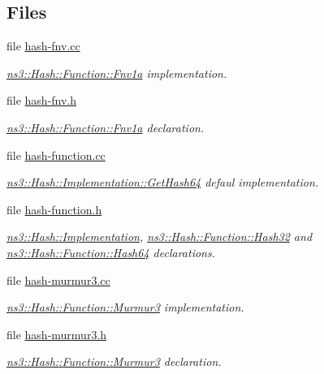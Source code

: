 \subsection*{Files}
\begin{DoxyCompactItemize}
\item 
file \hyperlink{hash-fnv_8cc}{hash-\/fnv.\+cc}
\begin{DoxyCompactList}\small\item\em \hyperlink{classns3_1_1Hash_1_1Function_1_1Fnv1a}{ns3\+::\+Hash\+::\+Function\+::\+Fnv1a} implementation. \end{DoxyCompactList}\item 
file \hyperlink{hash-fnv_8h}{hash-\/fnv.\+h}
\begin{DoxyCompactList}\small\item\em \hyperlink{classns3_1_1Hash_1_1Function_1_1Fnv1a}{ns3\+::\+Hash\+::\+Function\+::\+Fnv1a} declaration. \end{DoxyCompactList}\item 
file \hyperlink{hash-function_8cc}{hash-\/function.\+cc}
\begin{DoxyCompactList}\small\item\em \hyperlink{classns3_1_1Hash_1_1Implementation_ae11335959394d22427d81abfa520106a}{ns3\+::\+Hash\+::\+Implementation\+::\+Get\+Hash64} defaul implementation. \end{DoxyCompactList}\item 
file \hyperlink{hash-function_8h}{hash-\/function.\+h}
\begin{DoxyCompactList}\small\item\em \hyperlink{classns3_1_1Hash_1_1Implementation}{ns3\+::\+Hash\+::\+Implementation}, \hyperlink{classns3_1_1Hash_1_1Function_1_1Hash32}{ns3\+::\+Hash\+::\+Function\+::\+Hash32} and \hyperlink{classns3_1_1Hash_1_1Function_1_1Hash64}{ns3\+::\+Hash\+::\+Function\+::\+Hash64} declarations. \end{DoxyCompactList}\item 
file \hyperlink{hash-murmur3_8cc}{hash-\/murmur3.\+cc}
\begin{DoxyCompactList}\small\item\em \hyperlink{classns3_1_1Hash_1_1Function_1_1Murmur3}{ns3\+::\+Hash\+::\+Function\+::\+Murmur3} implementation. \end{DoxyCompactList}\item 
file \hyperlink{hash-murmur3_8h}{hash-\/murmur3.\+h}
\begin{DoxyCompactList}\small\item\em \hyperlink{classns3_1_1Hash_1_1Function_1_1Murmur3}{ns3\+::\+Hash\+::\+Function\+::\+Murmur3} declaration. \end{DoxyCompactList}\item 

\end{DoxyCompactItemize}
